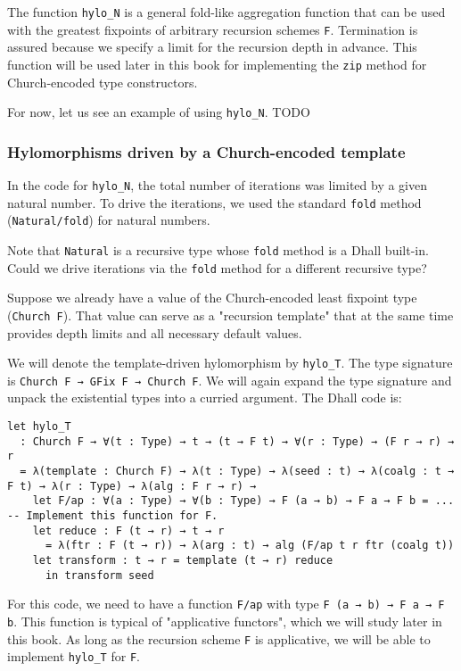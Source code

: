 The function \lstinline!hylo_N! is a general fold-like aggregation function that can be used with the greatest fixpoints of arbitrary recursion schemes \lstinline!F!. 
Termination is assured because we specify a limit for the recursion depth in advance.
This function will be used later in this book for implementing the \lstinline!zip! method for Church-encoded type constructors.


For now, let us see an example of using \lstinline!hylo_N!.  TODO


\subsubsection{Hylomorphisms driven by a Church-encoded template}


In the code for \lstinline!hylo_N!, the total number of iterations was limited by a given natural number.
To drive the iterations, we used the standard \lstinline!fold! method (\lstinline!Natural/fold!) for natural numbers.


Note that \lstinline!Natural! is a recursive type whose \lstinline!fold! method is a Dhall built-in.
Could we drive iterations via the \lstinline!fold! method for a different recursive type?


Suppose we already have a value of the Church-encoded least fixpoint type (\lstinline!Church F!).
That value can serve as a "recursion template" that at the same time provides depth limits and all necessary default values.


We will denote the template-driven hylomorphism by \lstinline!hylo_T!.
The type signature is \lstinline!Church F → GFix F → Church F!.
We will again expand the type signature and unpack the existential types into a curried argument.
The Dhall code is:


\begin{lstlisting}[language=Dhall]
let hylo_T
  : Church F → ∀(t : Type) → t → (t → F t) → ∀(r : Type) → (F r → r) → r
  = λ(template : Church F) → λ(t : Type) → λ(seed : t) → λ(coalg : t → F t) → λ(r : Type) → λ(alg : F r → r) →
    let F/ap : ∀(a : Type) → ∀(b : Type) → F (a → b) → F a → F b = ... -- Implement this function for F.
    let reduce : F (t → r) → t → r
      = λ(ftr : F (t → r)) → λ(arg : t) → alg (F/ap t r ftr (coalg t))
    let transform : t → r = template (t → r) reduce
      in transform seed 
\end{lstlisting}


For this code, we need to have a function \lstinline!F/ap! with type \lstinline!F (a → b) → F a → F b!.
This function is typical of "applicative functors", which we will study later in this book.
As long as the recursion scheme \lstinline!F! is applicative, we will be able to implement \lstinline!hylo_T! for \lstinline!F!.



